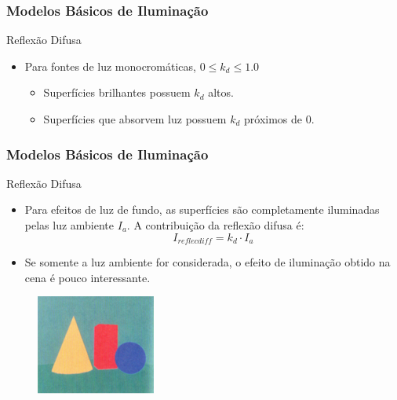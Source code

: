 \documentclass{beamer}
\begin{document}
\begin{frame}
\frametitle{Modelos Básicos de Iluminação}

	\begin{block}{Reflexão Difusa}
		\begin{itemize}
			\item Para fontes de luz monocromáticas, $0 \leq k_d \leq 1.0$
			\begin{itemize}
				\item Superfícies brilhantes possuem $k_d$ altos.
				\item Superfícies que absorvem luz possuem $k_d$ próximos de 0.
			\end{itemize}						 
		\end{itemize}
	\end{block}
	
\end{frame}

\begin{frame}
\frametitle{Modelos Básicos de Iluminação}

	\begin{block}{Reflexão Difusa}
		\begin{itemize}
			\item Para efeitos de luz de fundo, as superfícies são completamente iluminadas pelas luz ambiente $I_a$. A contribuição da reflexão difusa é:
				\begin{equation*}
					I_{reflecdiff} = k_d \cdot I_a
				\end{equation*}
			\item Se somente a luz ambiente for considerada, o efeito de iluminação obtido na cena é pouco interessante.					 
		\end{itemize}
	\end{block}
	
	\begin{figure}[!h]
		\begin{center}
		\includegraphics[width=0.35\textwidth]{Figures/LuzFun}
		\end{center}
	\end{figure}	
	
\end{frame}
\end{document}
